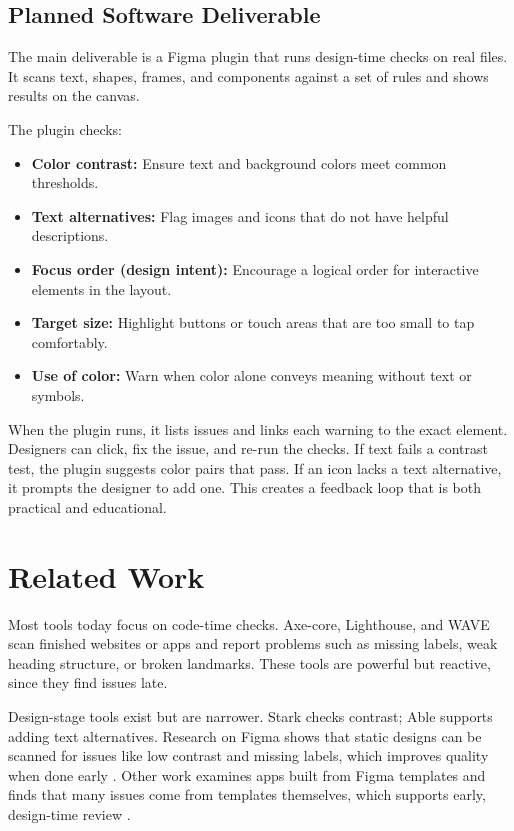 \documentclass[12pt]{article}
\begin{document}
\subsection{Planned Software Deliverable}
The main deliverable is a Figma plugin that runs design-time checks on real files. It scans text, shapes, frames, and components against a set of rules and shows results on the canvas.

The plugin checks:
\begin{itemize}
  \item \textbf{Color contrast:} Ensure text and background colors meet common thresholds.
  \item \textbf{Text alternatives:} Flag images and icons that do not have helpful descriptions.
  \item \textbf{Focus order (design intent):} Encourage a logical order for interactive elements in the layout.
  \item \textbf{Target size:} Highlight buttons or touch areas that are too small to tap comfortably.
  \item \textbf{Use of color:} Warn when color alone conveys meaning without text or symbols.
\end{itemize}

When the plugin runs, it lists issues and links each warning to the exact element. Designers can click, fix the issue, and re-run the checks. If text fails a contrast test, the plugin suggests color pairs that pass. If an icon lacks a text alternative, it prompts the designer to add one. This creates a feedback loop that is both practical and educational.

\section{Related Work}
Most tools today focus on code-time checks. Axe-core, Lighthouse, and WAVE scan finished websites or apps and report problems such as missing labels, weak heading structure, or broken landmarks. These tools are powerful but reactive, since they find issues late.

Design-stage tools exist but are narrower. Stark checks contrast; Able supports adding text alternatives. Research on Figma shows that static designs can be scanned for issues like low contrast and missing labels, which improves quality when done early \cite{huang2024a11yfigma,chen2024figmaapps}. Other work examines apps built from Figma templates and finds that many issues come from templates themselves, which supports early, design-time review \cite{muniz2024figmatemplates}.
\end{document}
